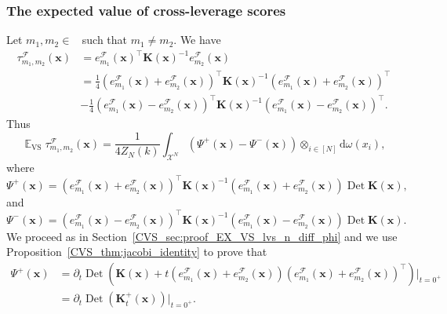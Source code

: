 \documentclass[twoside,11pt]{book}
\numberwithin{theorem}{chapter}
\numberwithin{definition}{chapter}
\numberwithin{proposition}{chapter}
\numberwithin{corollary}{chapter}
\numberwithin{example}{chapter}
\numberwithin{lemma}{chapter}
\numberwithin{assumption}{chapter}
\DeclareMathOperator{\Det}{Det}
\DeclareMathOperator{\VS}{\mathrm{VS}}
\DeclareMathOperator{\Tran}{\intercal}
\DeclareMathOperator{\EX}{\mathbb{E}}
\DeclareMathOperator{\F}{\mathcal{F}}
\DeclareMathOperator{\Ns}{\mathbb{N}^{*}}
\newcommand{\rb}[1]{\textcolor{magenta}{#1}}
\begin{document}
\subsubsection{The expected value of cross-leverage scores}
Let $m_{1},m_{2} \in \Ns$ such that $m_{1} \neq m_{2}$. We have
\begin{align}
\tau_{m_{1},m_{2}}^{\F}(\bm{x}) & = e_{m_{1}}^{\mathcal{F}}(\bm{x})^{\Tran}\bm{K}(\bm{x})^{-1}e_{m_{2}}^{\mathcal{F}}(\bm{x}) \nonumber \\
& = \frac{1}{4} \left(e_{m_{1}}^{\mathcal{F}}(\bm{x}) + e_{m_{2}}^{\mathcal{F}}(\bm{x})\right)^{\Tran}\bm{K}(\bm{x})^{-1}\left(e_{m_{1}}^{\mathcal{F}}(\bm{x}) + e_{m_{2}}^{\mathcal{F}}(\bm{x})\right)^{\Tran}  \nonumber \\
& - \frac{1}{4} \left(e_{m_{1}}^{\mathcal{F}}(\bm{x}) - e_{m_{2}}^{\mathcal{F}}(\bm{x})\right)^{\Tran}\bm{K}(\bm{x})^{-1}\left(e_{m_{1}}^{\mathcal{F}}(\bm{x}) - e_{m_{2}}^{\mathcal{F}}(\bm{x})\right)^{\Tran}.
\end{align}
Thus
\begin{equation}
\EX_{\VS} \tau_{m_{1},m_{2}}^{\F}(\bm{x}) = \frac{1}{4 Z_{N}(k)}\int_{\mathcal{X}^{N}} \left( \Psi^{+}(\bm{x}) - \Psi^{-}(\bm{x}) \right) \otimes_{i \in [N]}\mathrm{d}\omega(x_{i}),
\end{equation}
where
\begin{equation}
\Psi^{+}(\bm{x}) = \left(e_{m_{1}}^{\mathcal{F}}(\bm{x})+e_{m_{2}}^{\mathcal{F}}(\bm{x})\right)^{\Tran}\bm{K}(\bm{x})^{-1}\left(e_{m_{1}}^{\mathcal{F}}(\bm{x})+e_{m_{2}}^{\mathcal{F}}(\bm{x})\right) \Det \bm{K}(\bm{x}),
\end{equation}
and
\begin{equation}
\Psi^{-}(\bm{x}) = \left(e_{m_{1}}^{\mathcal{F}}(\bm{x})-e_{m_{2}}^{\mathcal{F}}(\bm{x})\right)^{\Tran}\bm{K}(\bm{x})^{-1}\left(e_{m_{1}}^{\mathcal{F}}(\bm{x})-e_{m_{2}}^{\mathcal{F}}(\bm{x})\right) \Det \bm{K}(\bm{x}).
\end{equation}
We proceed as in Section~\ref{CVS_sec:proof_EX_VS_lvs_n_diff_phi} and we use Proposition~\ref{CVS_thm:jacobi_identity} to prove that
\begin{align}
\Psi^{+}(\bm{x}) & = \partial_{t} \Det \left(\bm{K}(\bm{x})+t \left(e_{m_{1}}^{\mathcal{F}}(\bm{x}) + e_{m_{2}}^{\mathcal{F}}(\bm{x}) \right)\left(e_{m_{1}}^{\mathcal{F}}(\bm{x}) + e_{m_{2}}^{\mathcal{F}}(\bm{x}) \right)^{\Tran}\right)|_{t = 0^{+}} \nonumber \\
& = \partial_{t} \Det \left(\bm{K}_{t}^{+}(\bm{x})\right)|_{t = 0^{+}}.
\end{align}
\end{document}
